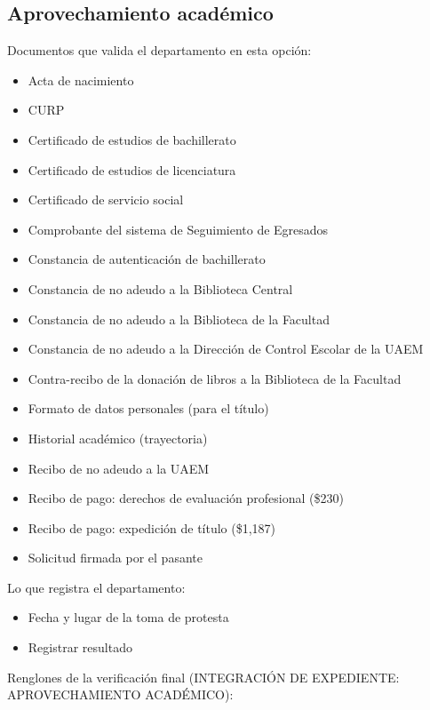 \subsection{Aprovechamiento académico}
Documentos que valida el departamento en esta opción:
\begin{itemize}
  \item Acta de nacimiento
  \item CURP
  \item Certificado de estudios de bachillerato
  \item Certificado de estudios de licenciatura
  \item Certificado de servicio social
  \item Comprobante del sistema de Seguimiento de Egresados
  \item Constancia de autenticación de bachillerato
  \item Constancia de no adeudo a la Biblioteca Central
  \item Constancia de no adeudo a la Biblioteca de la Facultad
  \item Constancia de no adeudo a la Dirección de Control Escolar de la UAEM
  \item Contra-recibo de la donación de libros a la Biblioteca de la Facultad
  \item Formato de datos personales (para el título)
  \item Historial académico (trayectoria)
  \item Recibo de no adeudo a la UAEM
  \item Recibo de pago: derechos de evaluación profesional (\$230)
  \item Recibo de pago: expedición de título (\$1,187)
  \item Solicitud firmada por el pasante
\end{itemize}
Lo que registra el departamento:
\begin{itemize}
  \item Fecha y lugar de la toma de protesta
  \item Registrar resultado
\end{itemize}
Renglones de la verificación final (INTEGRACIÓN DE EXPEDIENTE: APROVECHAMIENTO ACADÉMICO):
